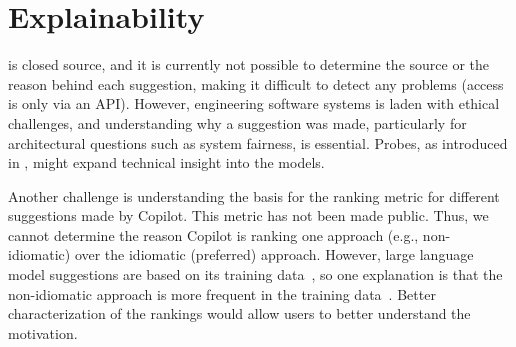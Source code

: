 \section{Explainability}
\label{explain}
\cop{} is closed source, and it is currently not possible to determine the source or the reason behind each suggestion, making it difficult to detect any problems (access is only via an API). 
However, engineering software systems is laden with ethical challenges, and understanding why a suggestion was made, particularly for architectural questions such as system fairness, is essential. 
Probes, as introduced in \cite{karmakar21}, might expand technical insight into the models.

Another challenge is understanding the basis for the ranking metric for different suggestions made by Copilot. This metric has not been made public. Thus, we cannot determine the reason Copilot is ranking one approach (e.g., non-idiomatic) over the idiomatic (preferred) approach. However, large language model suggestions are based on its training data~\cite{training_extraction}, so one explanation is that the non-idiomatic approach is more frequent in the training data~\cite{stochastic_parrots}. Better characterization of the rankings would allow users to better understand the motivation. 